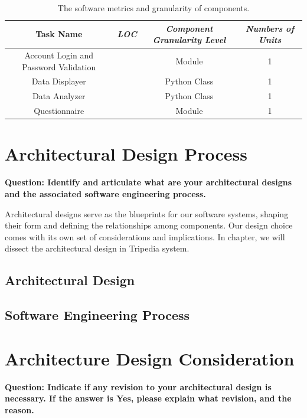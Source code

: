 \documentclass[conference]{IEEEtran}
\begin{document}
\begin{table}[htbp]
\caption{The software metrics and granularity of components.}
\begin{center}
\begin{tabular}{|c|c|c|c|}
\hline
\textbf{Task Name} & \textbf{\textit{LOC}}& \textbf{\textit{Component Granularity Level}}& \textbf{\textit{Numbers of Units}} \\
\hline
Account Login and Password Validation &  & Module & 1 \\
Data Displayer &   & Python Class & 1 \\
Data Analyzer &  & Python Class &  1 \\
Questionnaire &  & Module & 1 \\
\hline
\end{tabular}
\label{tab1}
\end{center}
\end{table}



\section{\textbf{Architectural Design Process}}

\textbf{Question: Identify and articulate what are your architectural designs and the associated
software engineering process.}

Architectural designs serve as the blueprints for our software systems, shaping their form and defining the relationships among components. Our design choice comes with its own set of considerations and implications. In chapter, we will dissect the architectural design in Tripedia system.


\subsection{\textbf{Architectural Design}}

\subsection{\textbf{Software Engineering Process}}


\section{\textbf{Architecture Design Consideration}}

\textbf{Question: Indicate if any revision to your architectural design is necessary. If the answer is Yes, please explain what revision, and the reason.}
\end{document}
